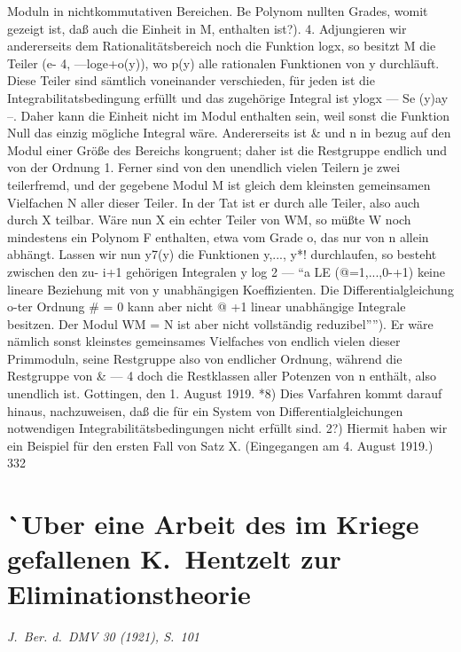 \documentclass[11pt,a4paper]{article}
\theoremstyle{plain}
\theoremstyle{definition}
\begin{document}
Moduln in nichtkommutativen Bereichen. 
Be 
Polynom nullten Grades, womit gezeigt ist, daß auch die Einheit in M, 
enthalten ist?). 
4. Adjungieren 
wir andererseits dem Rationalitätsbereich 
noch 
die 
Funktion logx, so besitzt M die Teiler 
(e- 
4, \guillemotright{} ---loge+o(y)), 
wo p(y) alle rationalen Funktionen von y durchläuft. 
Diese Teiler sind 
sämtlich voneinander verschieden, für jeden ist die Integrabilitatsbedingung 
erfüllt und das zugehörige Integral 
ist ylogx --- Se (y)ay --\guillemotleft{}. 
Daher 
kann die Einheit nicht im Modul enthalten sein, weil sonst die Funktion 
Null das einzig mögliche Integral wäre. 
Andererseits ist \& und n in bezug 
auf den Modul einer Größe des Bereichs kongruent; daher ist die Restgruppe 
endlich und von der Ordnung 1. 
Ferner sind von den unendlich vielen 
Teilern je zwei teilerfremd, 
und der gegebene Modul M ist gleich dem 
kleinsten gemeinsamen Vielfachen N aller dieser Teiler. 
In der Tat ist 
er durch alle Teiler, also auch durch X teilbar. 
Wäre nun X ein echter 
Teiler von WM, so müßte W noch mindestens 
ein Polynom F enthalten, 
etwa vom Grade 
o, das nur 
von 
n allein abhängt. 
Lassen wir nun 
y7(y) die Funktionen y,..., y\textdegree{}*! durchlaufen, so besteht zwischen den zu- 
i+1 
gehörigen Integralen y log 2 --- ``a LE \guillemotleft{}(@=1,...,0-+1) 
keine 
lineare 
Beziehung mit von y unabhängigen Koeffizienten. 
Die Differentialgleichung 
o-ter Ordnung \# = 0 kann aber nicht @ +1 linear unabhängige Integrale 
besitzen. 
Der Modul WM = N ist aber nicht vollständig reduzibel''''). 
Er wäre 
nämlich sonst kleinstes gemeinsames Vielfaches von endlich vielen dieser 
Primmoduln, 
seine Restgruppe also von endlicher Ordnung, während die 
Restgruppe von \& --- 4 doch die Restklassen aller Potenzen von n enthält, 
also unendlich ist. 
Gottingen, den 1. August 1919. 
*8) Dies Varfahren kommt darauf hinaus, nachzuweisen, daß die für ein System 
von Differentialgleichungen notwendigen Integrabilitätsbedingungen nicht erfüllt sind. 
2?) Hiermit haben wir ein Beispiel für den ersten Fall von Satz X. 
(Eingegangen am 4. August 1919.) 
332


\newpage
\section*{\``Uber eine Arbeit des im Kriege gefallenen K.~Hentzelt zur Eliminationstheorie}
\textit{J.~Ber. d.~DMV 30 (1921), S.~101}
\end{document}
